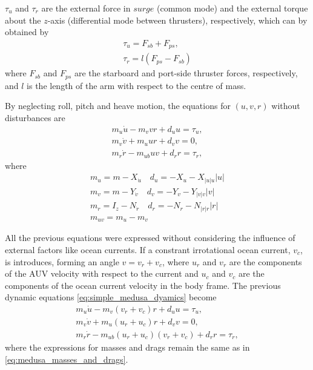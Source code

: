 \par $\tau_u$ and $\tau_r$ are the external force in $surge$ (common mode) and the external torque about the $z$-axis (differential mode between thrusters), respectively, which can by obtained by 
\begin{equation}
    \begin{gathered}
        \tau_u = F_{sb} + F_{ps}, \\
        \tau_r = l(F_{ps} - F_{sb})
    \end{gathered}
\end{equation}
where $F_{sb}$ and $F_{ps}$ are the starboard and port-side thruster forces, respectively, and $l$ is the length of the arm with respect to the centre of mass.
\par By neglecting roll, pitch and heave motion, the equations for $(u,v,r)$ without disturbances are
\begin{equation} 
    \begin{gathered}
        m_u\dot{u} - m_v v r + d_u u = \tau_u, \\
        m_v \dot{v} + m_u u r + d_v v = 0, \\
        m_r \dot{r} - m_{ub} u v + d_r r = \tau_r,
    \end{gathered}
    \label{eq:simple_medusa_dyamics}
\end{equation}
where
\begin{equation}
    \begin{gathered}
        m_u = m - X_{\dot{u}} \quad d_u = - X_u - X_{|u|u} |u| \\
        m_v = m - Y_{\dot{v}} \quad d_v = - Y_v - Y_{|v|v}|v| \\
        m_r = I_z - N_{\dot{r}} \quad d_r = - N_r - N_{|r|r}|r| \\
        m_{uv} = m_u - m_v
    \end{gathered}
    \label{eq:medusa_masses_and_drags}
\end{equation}


\par All the previous equations were expressed without considering the influence of external factors like ocean currents. If a constrant irrotational ocean current, $v_c$, is introduces, forming an angle $v = v_r+v_c$, where $u_r$ and $v_r$ are the components of the \acs{AUV} velocity with respect to the current and $u_c$ and $v_c$ are the components of the ocean current velocity in the body frame.
The previous dynamic equations \eqref{eq:simple_medusa_dyamics} become
\begin{equation}
    \begin{gathered}
        m_u\dot{u}-m_v(v_r+v_c)r+d_u u=\tau_u, \\
        m_v\dot{v}+m_u(u_r+u_c) r + d_v v=0, \\
        m_r\dot{r}-m_{ub}(u_r+u_c)(v_r+v_c)+d_r r=\tau_r,
    \end{gathered}
\end{equation}
where the expressions for masses and drags remain the same as in \eqref{eq:medusa_masses_and_drags}.


